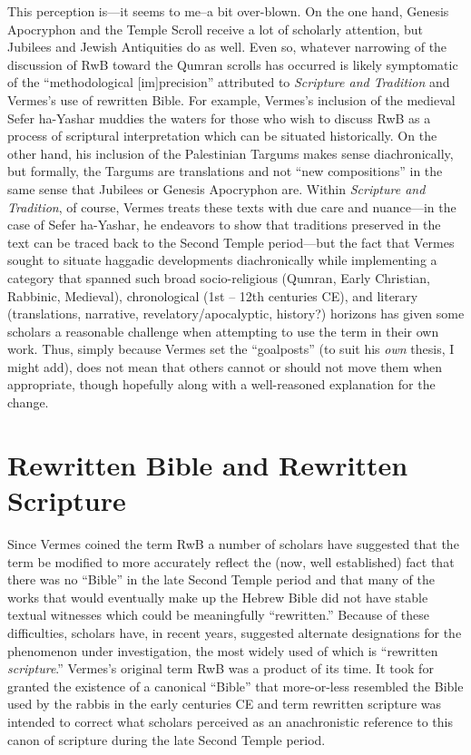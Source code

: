 This perception is---it seems to me--a bit over-blown. On the one hand,
Genesis Apocryphon and the Temple Scroll receive a lot of scholarly
attention, but Jubilees and Jewish Antiquities do as well. Even so,
whatever narrowing of the discussion of RwB toward the Qumran scrolls
has occurred is likely symptomatic of the ``methodological
{[}im{]}precision'' attributed to \emph{Scripture and Tradition} and
Vermes's use of rewritten Bible. For example, Vermes's inclusion of the
medieval Sefer ha-Yashar muddies the waters for those who wish to
discuss RwB as a process of scriptural interpretation which can be
situated historically. On the other hand, his inclusion of the
Palestinian Targums makes sense diachronically, but formally, the
Targums are translations and not ``new compositions'' in the same sense
that Jubilees or Genesis Apocryphon are. Within
\emph{Scripture and Tradition}, of course, Vermes treats these texts
with due care and nuance---in the case of Sefer ha-Yashar, he endeavors
to show that traditions preserved in the text can be traced back to the
Second Temple period---but the fact that Vermes sought to situate
haggadic developments diachronically while implementing a category that
spanned such broad socio-religious (Qumran, Early Christian, Rabbinic,
Medieval), chronological (1st -- 12th centuries CE), and literary
(translations, narrative, revelatory/apocalyptic, history?) horizons has
given some scholars a reasonable challenge when attempting to use the
term in their own work. Thus, simply because Vermes set the
``goalposts'' (to suit his \emph{own} thesis, I might add), does not
mean that others cannot or should not move them when appropriate, though
hopefully along with a well-reasoned explanation for the change.

\hypertarget{rwb-and-rewritten-scripture}{%
\section{Rewritten Bible and Rewritten
Scripture}\label{rwb-and-rewritten-scripture}}

Since Vermes coined the term RwB a number of scholars have suggested
that the term be modified to more accurately reflect the (now, well
established) fact that there was no ``Bible'' in the late Second Temple
period and that many of the works that would eventually make up the
Hebrew Bible did not have stable textual witnesses which could be
meaningfully ``rewritten.'' Because of these difficulties, scholars
have, in recent years, suggested alternate designations for the
phenomenon under investigation, the most widely used of which is
``rewritten \emph{scripture}.'' Vermes's original term RwB was a product
of its time. It took for granted the existence of a canonical ``Bible''
that more-or-less resembled the Bible used by the rabbis in the early
centuries CE and term rewritten scripture was intended to correct what
scholars perceived as an anachronistic reference to this canon of
scripture during the late Second Temple
period.\autocites[58--59]{campbell_zsengeller2014}[See
also][]{ulrich_mcdonald-sanders2002}[and][]{ulrich_zsengeller2014}

